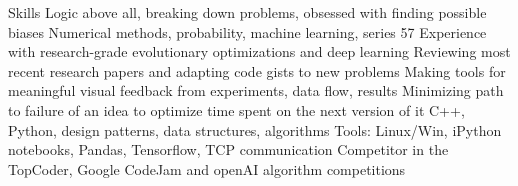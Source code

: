 \begin{rubric}{Skills}
\entry*[]%
Logic above all, breaking down problems, obsessed with finding possible biases 
\entry*[]%
Numerical methods, probability, machine learning, series 57%
\entry*[]%
Experience with research-grade evolutionary optimizations and deep learning 
\entry*[]%
Reviewing most recent research papers and adapting code gists to new problems
\entry*[]%
Making tools for meaningful visual feedback from experiments, data flow, results
\entry*[]%
Minimizing path to failure of an idea to optimize time spent on the next version of it
%
%
\entry*[]%
C++, Python, design patterns, data structures, algorithms
\entry*[]%
Tools: Linux/Win, iPython notebooks, Pandas, Tensorflow, TCP communication 
\entry*[]%
Competitor in the TopCoder, Google CodeJam and openAI algorithm competitions
%
%
%
%
\end{rubric}
